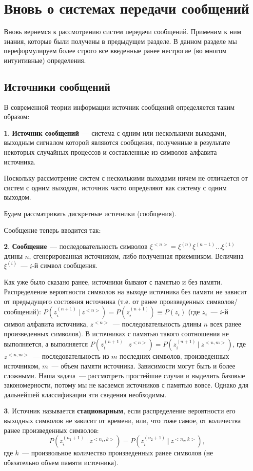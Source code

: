 \documentclass[12pt,a4paper,openright]{book}
\theoremstyle{definition}
\newtheorem{definition}{\textls[150]{Определение}}[chapter]
\numberwithin{equation}{chapter}
\begin{document}
	\section{Вновь о системах передачи сообщений}

	Вновь вернемся к рассмотрению систем передачи сообщений. Применим к ним знания, которые были получены в предыдущем разделе. В данном разделе мы переформулируем более строго все введенные ранее нестрогие (во многом интуитивные) определения.

	\subsection{Источники сообщений}

	В современной теории информации источник сообщений определяется таким образом:
	\begin{definition}
		\textbf{Источник сообщений}~--- система с одним или несколькими выходами, выходным сигналом которой являются сообщения, полученные в результате некоторых случайных процессов и составленные из символов алфавита источника.
	\end{definition}
	Поскольку рассмотрение систем с несколькими выходами ничем не отличается от систем с одним выходом, источник часто определяют как систему с одним выходом.

	Будем рассматривать дискретные источники (сообщения).

	Сообщение теперь вводится так:
	\begin{definition}
		\textbf{Сообщение}~--- последовательность символов $\xi^{<n>} = \xi^{(n)} \xi^{(n-1)} \dots \xi^{(1)}$ длины $n$, сгенерированная источником, либо полученная приемником. Величина $\xi^{(i)}$~--- $i$-й символ сообщения.
	\end{definition}

	Как уже было сказано ранее, источники бывают с памятью и без памяти. Распределение вероятности символов на выходе источника без памяти не зависит от предыдущего состояния источника (т.е. от ранее произведенных символов/сообщений): $P(z_i^{(n+1)}\ |\ z^{<n>}) = P(z_i^{(n+1)}) \equiv P(z_i)$ (где $z_i$~--- $i$-й символ алфавита источника, $z^{<n>}$~--- последовательность длины $n$ всех ранее произведенных символов). В источниках с памятью такого соотношения не выполняется, а выполняется $P(z_i^{(n+1)}\ |\ z^{<n>}) = P(z_i^{(n+1)}\ |\ z^{<n,m>})$, где $z^{<n,m>}$~--- последовательность из $m$ последних символов, произведенных источником, $m$~--- объем памяти источника. Зависимости могут быть и более сложными. Наша задача~--- рассмотреть простейшие случаи и выделить базовые закономерности, потому мы не касаемся источников с памятью вовсе. Однако для дальнейшей классификации эти сведения необходимы.
	\begin{definition}
		Источник называется \textbf{стационарным}, если распределение вероятности его выходных символов не зависит от времени, или, что тоже самое, от количества ранее произведенных символов:
		$$P(z_i^{(n_1+1)}\ |\ z^{<n_1,k>}) = P(z_i^{(n_2+1)}\ |\ z^{<n_2,k>}) \text{,}$$
		где $k$~--- произвольное количество произведенных ранее символов (не обязательно объем памяти источника).
	\end{definition}
\end{document}
